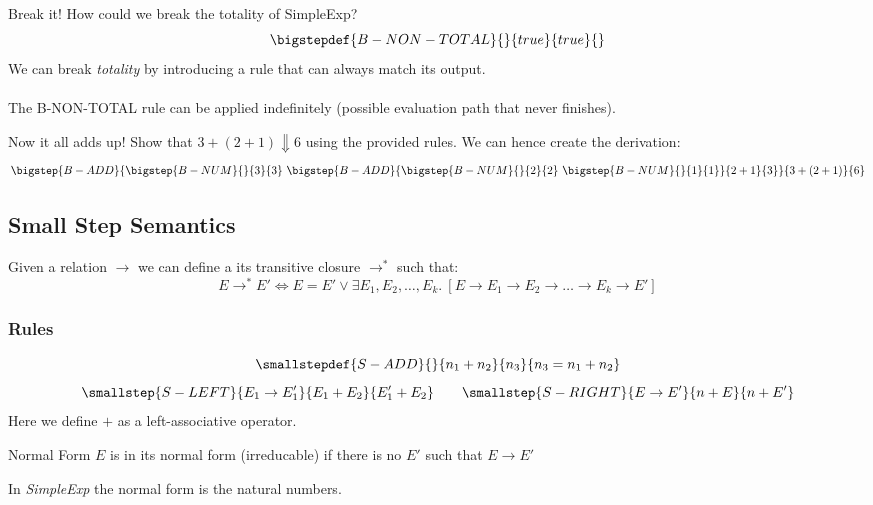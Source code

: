 \begin{examplebox}{Break it!}
    How could we break the totality of SimpleExp?
    \tcblower
    \[\bigstepdef{B-NON-TOTAL}{}{true}{true}{}\]
    We can break \textit{totality} by introducing a rule that can always match its output.
    \\ 
    \\ The B-NON-TOTAL rule can be applied indefinitely (possible evaluation path that never finishes).
\end{examplebox}

\begin{examplebox}{Now it all adds up!}
    Show that $3 + (2 + 1) \Downarrow 6$ using the provided rules.
    \tcblower
    We can hence create the derivation:
    \[\bigstep{B-ADD}{
        \bigstep{B-NUM}{}{3}{3} \ \bigstep{B-ADD}{
            \bigstep{B-NUM}{}{2}{2} \ \bigstep{B-NUM}{}{1}{1}
        }{2 + 1}{3}
    }{3 + (2 + 1)}{6}\] 
\end{examplebox}

\subsection{Small Step Semantics}
Given a relation $\to$ we can define a its transitive closure $\to^*$ such that:
\[E \to^* E' \Leftrightarrow E = E' \lor \exists E_1, E_2, \dots, E_k . \ [E \to E_1 \to E_2 \to \dots \to E_k \to E'] \]

\subsubsection{Rules}
\[\smallstepdef{S-ADD}{}{n_1 + n_2}{n_3}{n_3 = n_1 + n_2}\]
\[\smallstep{S-LEFT}{E_1 \to E_1'}{E_1 + E_2}{E_1' + E_2} \qquad \smallstep{S-RIGHT}{E \to E'}{n + E}{n + E'}\]
Here we define $+$ as a left-associative operator.
\begin{definitionbox}{Normal Form}
    $E$ is in its normal form (irreducable) if there is no $E'$ such that $E \to E'$        
\end{definitionbox}
\noindent In \textit{SimpleExp} the normal form is the natural numbers.

